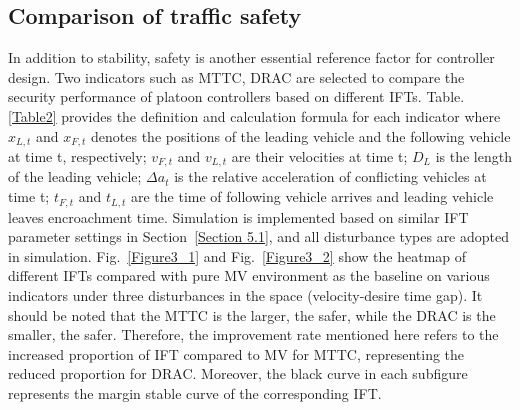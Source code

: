 \documentclass[journal]{IEEEtran}
\begin{document}
\subsection{Comparison of traffic safety}
\label{Section 5.4}

In addition to stability, safety is another essential reference factor for controller design. Two indicators such as MTTC, DRAC are selected to compare the security performance of platoon controllers based on different IFTs. Table.\ref{Table2} provides the definition and calculation formula for each indicator where $x_{L,t}$ and $x_{F,t}$ denotes the positions of the leading vehicle and the following vehicle at time t, respectively; $v_{F,t}$ and $v_{L,t}$ are their velocities at time t; $D_L$ is the length of the leading vehicle; $\Delta a_t$ is the relative acceleration of conflicting vehicles at time t; $t_{F,t}$ and $t_{L,t}$ are the time of following vehicle arrives and leading vehicle leaves encroachment time. Simulation is implemented based on similar IFT parameter settings in Section~\ref{Section 5.1}, and all disturbance types are adopted in simulation. Fig.~\ref{Figure3_1} and Fig.~\ref{Figure3_2} show the heatmap of different IFTs compared with pure MV environment as the baseline on various indicators under three disturbances in the space (velocity-desire time gap). It should be noted that the MTTC is the larger, the safer, while the DRAC is the smaller, the safer. Therefore, the improvement rate mentioned here refers to the increased proportion of IFT compared to MV for MTTC, representing the reduced proportion for DRAC. Moreover, the black curve in each subfigure represents the margin stable curve of the corresponding IFT.

\begin{table}\large
    \centering
    \setlength{\abovecaptionskip}{0pt}
    \setlength{\belowcaptionskip}{10pt}%
    \caption{~Definitions and formulas of indicators used to evaluate safety.}
\label{Table2}
\end{table}
\end{document}
